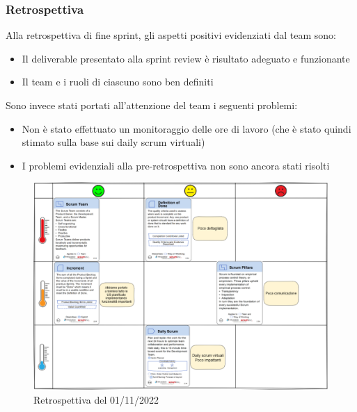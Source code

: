 \subsubsection*{Retrospettiva}
Alla retrospettiva di fine sprint, gli aspetti positivi evidenziati dal team sono:
\begin{itemize}
    \item Il deliverable presentato alla sprint review è risultato adeguato e funzionante
    \item Il team e i ruoli di ciascuno sono ben definiti
\end{itemize}
Sono invece stati portati all'attenzione del team i seguenti problemi:
\begin{itemize}
    \item Non è stato effettuato un monitoraggio delle ore di lavoro (che è stato quindi stimato sulla base sui daily scrum virtuali)
    \item I problemi evidenziali alla pre-retrospettiva non sono ancora stati risolti 
\end{itemize}
\begin{figure}[H]
    \centering
    \includegraphics[width=15cm]{./img/sprint1/retrospettiva.png}
    \caption{Retrospettiva del 01/11/2022}
\end{figure}